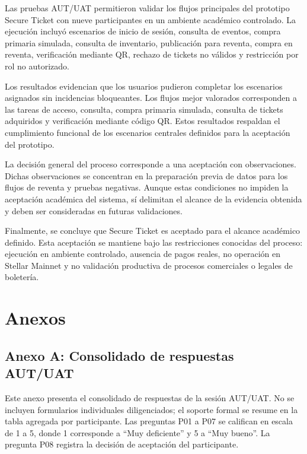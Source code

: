 \documentclass[12pt,letterpaper]{article}
\begin{document}
Las pruebas AUT/UAT permitieron validar los flujos principales del prototipo Secure Ticket con nueve participantes en un ambiente académico controlado. La ejecución incluyó escenarios de inicio de sesión, consulta de eventos, compra primaria simulada, consulta de inventario, publicación para reventa, compra en reventa, verificación mediante QR, rechazo de tickets no válidos y restricción por rol no autorizado.

Los resultados evidencian que los usuarios pudieron completar los escenarios asignados sin incidencias bloqueantes. Los flujos mejor valorados corresponden a las tareas de acceso, consulta, compra primaria simulada, consulta de tickets adquiridos y verificación mediante código QR. Estos resultados respaldan el cumplimiento funcional de los escenarios centrales definidos para la aceptación del prototipo.

La decisión general del proceso corresponde a una aceptación con observaciones. Dichas observaciones se concentran en la preparación previa de datos para los flujos de reventa y pruebas negativas. Aunque estas condiciones no impiden la aceptación académica del sistema, sí delimitan el alcance de la evidencia obtenida y deben ser consideradas en futuras validaciones.

Finalmente, se concluye que Secure Ticket es aceptado para el alcance académico definido. Esta aceptación se mantiene bajo las restricciones conocidas del proceso: ejecución en ambiente controlado, ausencia de pagos reales, no operación en Stellar Mainnet y no validación productiva de procesos comerciales o legales de boletería.

\section{Anexos}

\subsection{Anexo A: Consolidado de respuestas AUT/UAT}

Este anexo presenta el consolidado de respuestas de la sesión AUT/UAT. No se incluyen formularios individuales diligenciados; el soporte formal se resume en la tabla agregada por participante. Las preguntas P01 a P07 se califican en escala de 1 a 5, donde 1 corresponde a ``Muy deficiente'' y 5 a ``Muy bueno''. La pregunta P08 registra la decisión de aceptación del participante.
\end{document}
